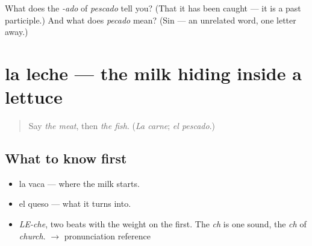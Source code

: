 \begin{tcolorbox}[breakable,colback=teal!4,colframe=teal!35!black,title={Before you move on}]
What does the \emph{-ado} of \emph{pescado} tell you? (That it has been caught — it is a past participle.) And what does \emph{pecado} mean? (Sin — an unrelated word, one letter away.)
\end{tcolorbox}
\section[la leche]{la leche — the milk hiding inside a lettuce}

\label{lesson:ES-C361-leche}



\begin{quote}
Say \emph{the meat}, then \emph{the fish}. (\emph{La carne}; \emph{el pescado}.)
\end{quote}

\subsection*{What to know first}
\begin{itemize}
\raggedright
  \item la vaca — where the milk starts.
  \item el queso — what it turns into.
\end{itemize}

\begin{sounds}
\begin{itemize}
\raggedright
  \item \emph{LE-che}, two beats with the weight on the first. The \emph{ch} is one sound, the \emph{ch} of \emph{church}. $\to$ pronunciation reference
\end{itemize}
\end{sounds}

